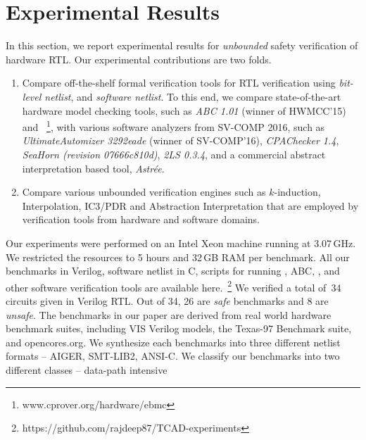 \section{Experimental Results}
In this section, we report experimental results for \emph{unbounded} safety 
verification of hardware RTL.  Our experimental contributions are two folds.
%
\begin{enumerate}
  \item Compare off-the-shelf formal verification tools for RTL verification
    using \emph{bit-level netlist}, and \emph{software netlist}.  
    To this end, we compare state-of-the-art hardware model checking tools, such as 
    \emph{ABC 1.01} (winner of HWMCC'15) and 
    \ebmcv~\footnote{\scriptsize{www.cprover.org/hardware/ebmc}}, 
    with various software analyzers from SV-COMP 2016, such as 
    \emph{UltimateAutomizer 3292eade} (winner of SV-COMP'16), 
    \emph{CPAChecker 1.4}, 
    \emph{SeaHorn (revision 07666c810d)}, \emph{2LS 0.3.4}, 
    and a commercial abstract 
    interpretation based tool, \emph{Astr{\'e}e}.  
  
 \item  Compare various unbounded verification engines such as $k$-induction, 
    Interpolation, IC3/PDR and Abstraction Interpretation that are employed by 
    verification tools from hardware and software domains.
\end{enumerate}
%
Our experiments were performed on an Intel Xeon machine running at
3.07\,GHz.  We restricted the resources to 5 hours and 32\,GB RAM per
benchmark.  All our benchmarks in Verilog, software netlist in C, 
scripts for running \yosys, ABC, \ebmcv, and other software 
verification tools are available here.~\footnote{\scriptsize{https://github.com/rajdeep87/TCAD-experiments}}
%
%
We verified a total of~34 circuits given in Verilog RTL.  Out of 34, 26 
are \emph{safe} benchmarks and 8 are \emph{unsafe}.  The benchmarks in 
our paper are derived from real world hardware benchmark suites, including 
VIS Verilog models, the Texas-97 Benchmark suite, and opencores.org. We synthesize 
each benchmarks into three different netlist formats -- AIGER, SMT-LIB2, ANSI-C.
We classify our benchmarks into two different classes -- data-path intensive
